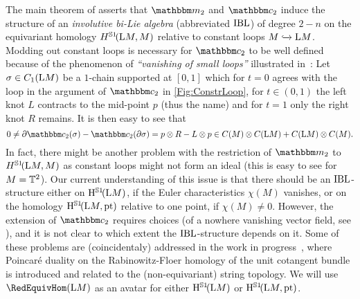 \documentclass[\MainFolder/Text.tex]{subfiles}
\begin{document}
The main theorem of \cite{Chas2004} asserts that $\StringOp_2$ and $\StringCoOp_2$ induce the structure of an \emph{involutive bi-Lie algebra} (abbreviated $\mathrm{IBL}$) of degree $2-n$ on the equivariant homology $H^{\mathbb{S}{1}}\!(\mathrm{L} M,M)$ relative to constant loops $M\xhookrightarrow{}\mathrm{L} M$. Modding out constant loops is necessary for $\StringCoOp_2$ to be well defined because of the phenomenon of \emph{``vanishing of small loops''} illustrated in~\cite{Cieliebak2007}:  Let $\sigma\in C_1(\mathrm{L} M)$ be a $1$-chain supported at $[0,1]$ which for $t=0$ agrees with the loop in the argument of $\StringCoOp_2$ in \ref{Fig:ConstrLoop}, for $t\in (0,1)$ the left knot $L$ contracts to the mid-point $p$ (thus the name) and for $t=1$ only the right knot $R$ remains. It is then easy to see that 
$$ 0 \neq \Bdd \StringCoOp_2(\sigma) - \StringCoOp_2(\Bdd \sigma) = p\otimes R - L \otimes p \in C(M)\otimes C(\Loop M) + C(\Loop M)\otimes C(M). $$
In fact, there might be another problem with the restriction of $\StringOp_2$ to $H^{\mathbb{S}{1}}\!(\mathrm{L} M,M)$ as constant loops might not form an ideal (this is easy to see for $M=\mathbb{T}^2$). Our current understanding of this issue is that there should be an $\mathrm{IBL}$-structure either on $\mathrm{H}^{\mathbb{S}{1}}\!(\mathrm{L} M)$, if the Euler characteristics $\chi(M)$ vanishes, or on the homology $\mathrm{H}^{\mathbb{S}{1}}\!(\mathrm{L} M,\mathrm{pt})$ relative to one point, if $\chi(M) \neq 0$. However, the extension of $\StringCoOp_2$ requires choices (of a nowhere vanishing vector field, see \cite{Basu2011}), and it is not clear to which extent the $\mathrm{IBL}$-structure depends on it. Some of these problems are (coincidentaly) addressed in the work in progress~\cite{Cieliebak2018}, where Poincar\'e duality on the Rabinowitz-Floer homology of the unit cotangent bundle is introduced and related to the (non-equivariant) string topology. We will use $\RedEquivHom(\Loop M)$ as an avatar for either $\mathrm{H}^{\mathbb{S}{1}}\!(\mathrm{L} M)$ or $\mathrm{H}^{\mathbb{S}{1}}\!(\mathrm{L} M,\mathrm{pt})$.
\end{document}
